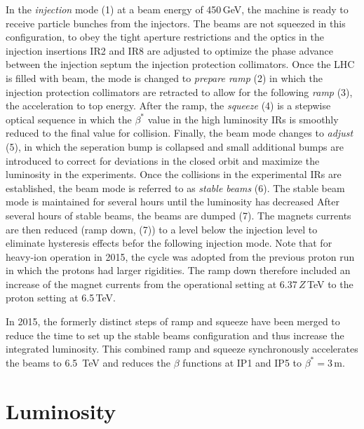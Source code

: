 In the \textit{injection} mode (1) at a beam energy of 450$\,$GeV, the machine is ready to receive particle bunches from the injectors. The beams are not squeezed in this configuration, to obey the tight aperture restrictions and the optics in the injection insertions IR2 and IR8 are adjusted to optimize the phase advance between the injection septum the injection protection collimators. Once the LHC is filled with beam, the mode is changed to \textit{prepare ramp} (2) in which the injection protection collimators are retracted to allow for the following \textit{ramp} (3), the acceleration to top energy. After the ramp, the \textit{squeeze} (4) is a stepwise optical sequence in which the $\beta^*$ value in the high luminosity IRs is smoothly reduced to the final value for collision. Finally, the beam mode changes to \textit{adjust} (5), in which the seperation bump is collapsed and small additional bumps are introduced to correct for deviations in the closed orbit and maximize the luminosity in the experiments. Once the collisions in the experimental IRs are established, the beam mode is referred to as \textit{stable beams} (6). 
The stable beam mode is maintained for several hours until the luminosity has decreased 
After several hours of stable beams, the beams are dumped (7). The magnets currents are then reduced (ramp down, (7)) to a level below the injection level to eliminate hysteresis effects befor the following injection mode. Note that for heavy-ion operation in 2015, the cycle was adopted from the previous proton run in which the protons had larger rigidities. The ramp down therefore included an increase of the magnet currents from the operational setting at 6.37$\,Z\,$TeV to the proton setting at 6.5$\,$TeV.

In 2015, the formerly distinct steps of ramp and squeeze have been merged to reduce the time to set up the stable beams configuration and thus increase the integrated luminosity. This combined ramp and squeeze synchronously accelerates the beams to 6.5~TeV and reduces the $\beta$ functions at IP1 and IP5 to $\beta^*=3\,$m.



\section{Luminosity} \label{chap:lumi}

